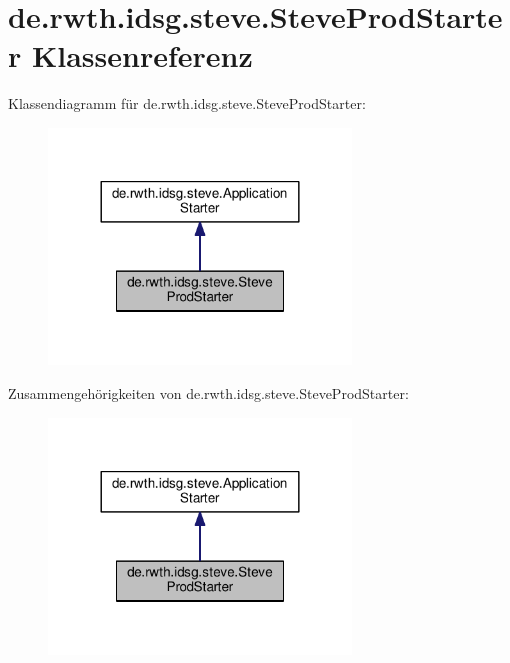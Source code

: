 \hypertarget{classde_1_1rwth_1_1idsg_1_1steve_1_1_steve_prod_starter}{\section{de.\+rwth.\+idsg.\+steve.\+Steve\+Prod\+Starter Klassenreferenz}
\label{classde_1_1rwth_1_1idsg_1_1steve_1_1_steve_prod_starter}
}


Klassendiagramm für de.\+rwth.\+idsg.\+steve.\+Steve\+Prod\+Starter\+:\nopagebreak
\begin{figure}[H]
\begin{center}
\leavevmode
\includegraphics[width=228pt]{classde_1_1rwth_1_1idsg_1_1steve_1_1_steve_prod_starter__inherit__graph}
\end{center}
\end{figure}


Zusammengehörigkeiten von de.\+rwth.\+idsg.\+steve.\+Steve\+Prod\+Starter\+:\nopagebreak
\begin{figure}[H]
\begin{center}
\leavevmode
\includegraphics[width=228pt]{classde_1_1rwth_1_1idsg_1_1steve_1_1_steve_prod_starter__coll__graph}
\end{center}
\end{figure}
